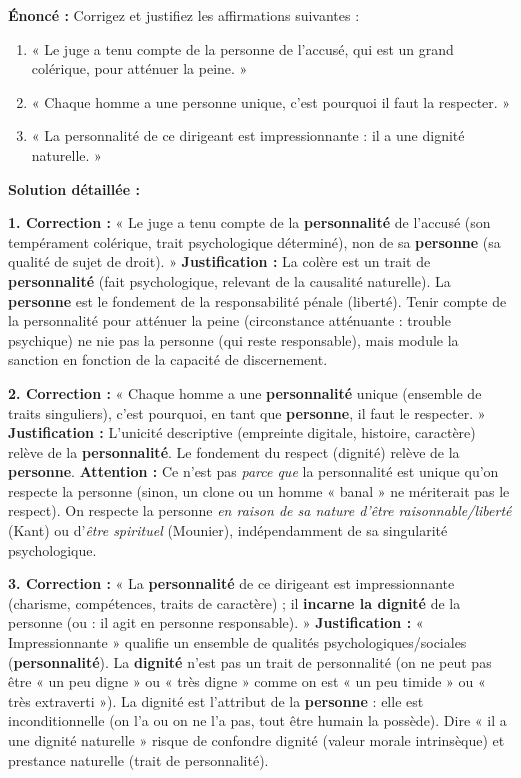 \documentclass[11pt]{article}
\newcommand{\cle}[1]{{\popxbold\color{popdark}#1}}
\begin{document}
\begin{exoresolu}
\textbf{Énoncé :} Corrigez et justifiez les affirmations suivantes :
\begin{enumerate}
    \item « Le juge a tenu compte de la personne de l'accusé, qui est un grand colérique, pour atténuer la peine. »
    \item « Chaque homme a une personne unique, c'est pourquoi il faut la respecter. »
    \item « La personnalité de ce dirigeant est impressionnante : il a une dignité naturelle. »
\end{enumerate}
\tcblower
\textbf{Solution détaillée :}

\textbf{1. Correction :} « Le juge a tenu compte de la \textbf{personnalité} de l'accusé (son tempérament colérique, trait psychologique déterminé), non de sa \textbf{personne} (sa qualité de sujet de droit). »
\textbf{Justification :} La colère est un trait de \textbf{personnalité} (fait psychologique, relevant de la causalité naturelle). La \textbf{personne} est le fondement de la responsabilité pénale (liberté). Tenir compte de la personnalité pour atténuer la peine (circonstance atténuante : trouble psychique) ne nie pas la personne (qui reste responsable), mais module la sanction en fonction de la capacité de discernement.

\textbf{2. Correction :} « Chaque homme a une \textbf{personnalité} unique (ensemble de traits singuliers), c'est pourquoi, en tant que \textbf{personne}, il faut le respecter. »
\textbf{Justification :} L'unicité descriptive (empreinte digitale, histoire, caractère) relève de la \textbf{personnalité}. Le fondement du respect (dignité) relève de la \textbf{personne}. \textbf{Attention :} Ce n'est pas \emph{parce que} la personnalité est unique qu'on respecte la personne (sinon, un clone ou un homme « banal » ne mériterait pas le respect). On respecte la personne \emph{en raison de sa nature d'être raisonnable/liberté} (Kant) ou d'\emph{être spirituel} (Mounier), indépendamment de sa singularité psychologique.

\textbf{3. Correction :} « La \textbf{personnalité} de ce dirigeant est impressionnante (charisme, compétences, traits de caractère) ; il \textbf{incarne la dignité} de la personne (ou : il agit en personne responsable). »
\textbf{Justification :} « Impressionnante » qualifie un ensemble de qualités psychologiques/sociales (\textbf{personnalité}). La \textbf{dignité} n'est pas un trait de personnalité (on ne peut pas être « un peu digne » ou « très digne » comme on est « un peu timide » ou « très extraverti »). La dignité est l'attribut de la \textbf{personne} : elle est \cle{inconditionnelle} (on l'a ou on ne l'a pas, tout être humain la possède). Dire « il a une dignité naturelle » risque de confondre dignité (valeur morale intrinsèque) et prestance naturelle (trait de personnalité).
\end{exoresolu}
\end{document}
